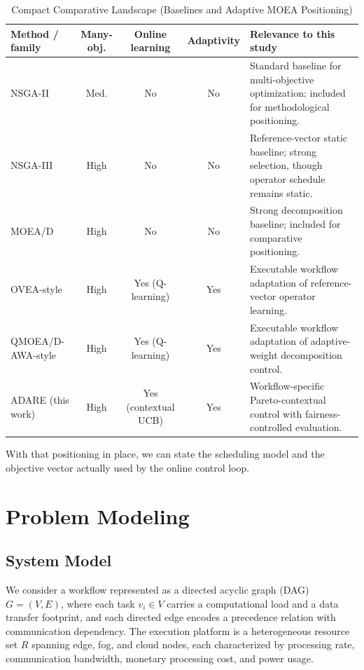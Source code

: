 \documentclass[preprint,12pt]{elsarticle}
\begin{document}
\begin{table}[t]
\caption{Compact Comparative Landscape (Baselines and Adaptive MOEA Positioning)}
\label{tab:baseline_landscape}
\centering
\scriptsize
\begin{tabularx}{\textwidth}{@{}l c c c >{\raggedright\arraybackslash}X@{}}
\toprule
Method / family & Many-obj. & Online learning & Adaptivity & Relevance to this study \\
\midrule
NSGA-II \cite{deb2002nsga2} & Med. & No & No & Standard baseline for multi-objective optimization; included for methodological positioning. \\
NSGA-III \cite{deb2014nsga3} & High & No & No & Reference-vector static baseline; strong selection, though operator schedule remains static. \\
MOEA/D \cite{zhang2007moead} & High & No & No & Strong decomposition baseline; included for comparative positioning. \\
OVEA-style \cite{jiao2023ovea} & High & Yes (Q-learning) & Yes & Executable workflow adaptation of reference-vector operator learning. \\
QMOEA/D-AWA-style \cite{wang2026qmoeadawa} & High & Yes (Q-learning) & Yes & Executable workflow adaptation of adaptive-weight decomposition control. \\
ADARE (this work) & High & Yes (contextual UCB) & Yes & Workflow-specific Pareto-contextual control with fairness-controlled evaluation. \\
\bottomrule
\end{tabularx}
\end{table}

With that positioning in place, we can state the scheduling model and the objective vector actually used by the online control loop.

\section{Problem Modeling}
\subsection{System Model}
We consider a workflow represented as a directed acyclic graph (DAG) $G=(V,E)$, where each task $v_i \in V$ carries a computational load and a data transfer footprint, and each directed edge encodes a precedence relation with communication dependency. The execution platform is a heterogeneous resource set $R$ spanning edge, fog, and cloud nodes, each characterized by processing rate, communication bandwidth, monetary processing cost, and power usage.
\end{document}
